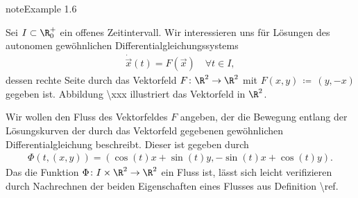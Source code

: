 \documentclass[letterpaper,10pt,english]{jupyterBook}
\begin{document}
\begin{sphinxadmonition}{note}{Example 1.6}



\sphinxAtStartPar
Sei \(I\subset \R_0^+\) ein offenes Zeitintervall.
Wir interessieren uns für Lösungen des autonomen gewöhnlichen Differentialgleichungssystems
\begin{equation*}
\begin{split}\dot{\vec{x}}(t) = F(\vec{x}) \quad \forall t\in I,\end{split}
\end{equation*}
\sphinxAtStartPar
dessen rechte Seite durch das Vektorfeld \(F \colon \R^2 \rightarrow \R^2\) mit \(F(x,y) \, \coloneqq \, (y, -x)\) gegeben ist.
Abbildung \textbackslash{}xxx illustriert das Vektorfeld in \(\R^2\).

\sphinxAtStartPar
Wir wollen den Fluss des Vektorfeldes \(F\) angeben, der die Bewegung entlang der Lösungskurven der durch das Vektorfeld gegebenen gewöhnlichen Differentialgleichung beschreibt.
Dieser ist gegeben durch
\begin{equation*}
\begin{split}\Phi(t,(x,y)) = (\cos(t)x + \sin(t)y, -\sin(t)x + \cos(t)y).\end{split}
\end{equation*}
\sphinxAtStartPar
Das die Funktion \(\Phi \colon I \times \R^2 \rightarrow \R^2\) ein Fluss ist, lässt sich leicht verifizieren durch Nachrechnen der beiden Eigenschaften eines Flusses aus Definition \textbackslash{}ref.


\end{sphinxadmonition}
\end{document}

